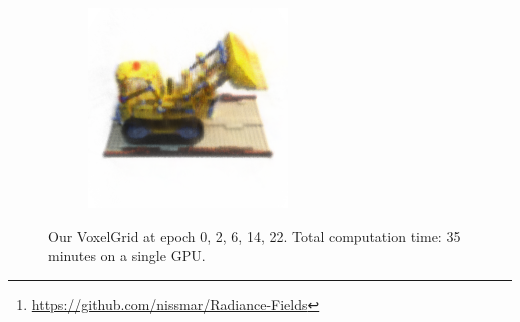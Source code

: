 \documentclass{article}
\begin{document}
\begin{figure}[!h]
\begin{subfigure}{.19\textwidth}
\end{subfigure}
\begin{subfigure}{.19\textwidth}
  \centering
  \includegraphics[width=\linewidth]{figs/model32.png}  
\end{subfigure}
     \caption{Our VoxelGrid at epoch {0, 2, 6, 14, 22}. Total computation time: 35 minutes on a single GPU.}
    \label{fig:lego_optim}
\end{figure}


\begin{abstract}
This project report is a study of the article \textbf{Plenoxels: Radiance Fields without Neural Networks} \cite{plenoxels}. Being in the impossibility of using the provided custom CUDA kernel, we have re-implemented the method and a few of the proposed optimizations from scratch. Limiting ourselves to a small 128-sized grid, our implementation achieves a peak-signal-to-noise ratio of $22.10$ dB, not so far from the $23.74$ dB mentioned in the article with a similar setting. We propose two novel extensions: the first one is inspired by \textbf{Space carving} \cite{spacecarving} and allows the generation of clean point clouds from photographs, and the second one relies on a different optimization method and achieves a PSNR of $22.90$ dB. We strongly urge the reader to visit our GitHub repository\footnote{\url{https://github.com/nissmar/Radiance-Fields}} which features animated GIFs, allowing a better viewing of our results (which are on the last page of this report).
\end{abstract}
\end{document}
